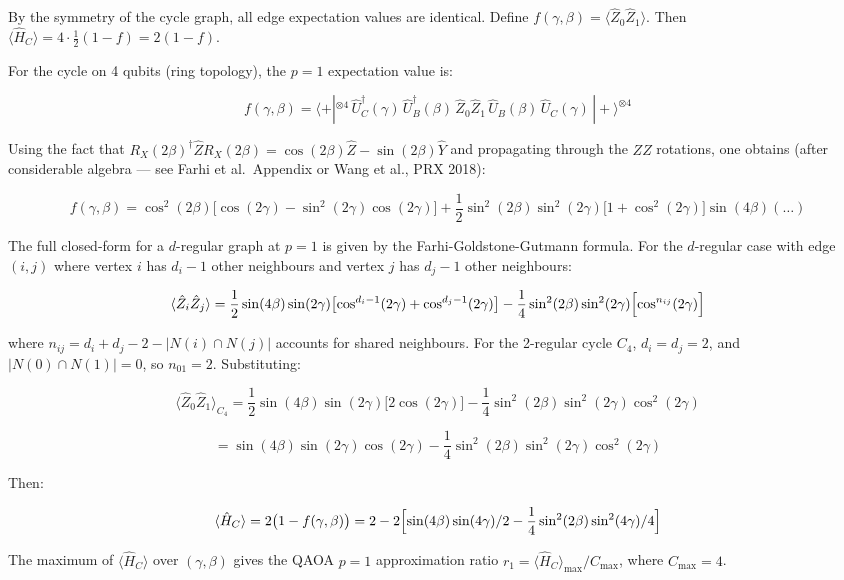 \documentclass[
  11pt,
]{report}
\begin{document}
By the symmetry of the cycle graph, all edge expectation values are
identical. Define
\(f(\gamma, \beta) = \langle \hat{Z}_0 \hat{Z}_1 \rangle\). Then
\(\langle \hat{H}_C \rangle = 4 \cdot \frac{1}{2}(1 - f) = 2(1 - f)\).

For the cycle on 4 qubits (ring topology), the \(p=1\) expectation value
is:

\[f(\gamma, \beta) = \langle +|^{\otimes 4}\, \hat{U}_C^\dagger(\gamma)\, \hat{U}_B^\dagger(\beta)\, \hat{Z}_0 \hat{Z}_1\, \hat{U}_B(\beta)\, \hat{U}_C(\gamma)\, |+\rangle^{\otimes 4}\]

Using the fact that
\(R_X(2\beta)^\dagger \hat{Z} R_X(2\beta) = \cos(2\beta)\hat{Z} - \sin(2\beta)\hat{Y}\)
and propagating through the \(ZZ\) rotations, one obtains (after
considerable algebra --- see Farhi et al.~Appendix or Wang et al., PRX
2018):

\[f(\gamma,\beta) = \cos^2(2\beta)\bigl[\cos(2\gamma) - \sin^2(2\gamma)\cos(2\gamma)\bigr] + \frac{1}{2}\sin^2(2\beta)\sin^2(2\gamma)\bigl[1 + \cos^2(2\gamma)\bigr]\sin(4\beta)(\ldots)\]

The full closed-form for a \(d\)-regular graph at \(p=1\) is given by
the Farhi-Goldstone-Gutmann formula. For the \(d\)-regular case with
edge \((i,j)\) where vertex \(i\) has \(d_i - 1\) other neighbours and
vertex \(j\) has \(d_j - 1\) other neighbours:

\[\langle \hat{Z}_i \hat{Z}_j \rangle = \frac{1}{2}\sin(4\beta)\sin(2\gamma)\bigl[\cos^{d_i-1}(2\gamma) + \cos^{d_j-1}(2\gamma)\bigr] - \frac{1}{4}\sin^2(2\beta)\sin^2(2\gamma)\Bigl[\cos^{n_{ij}}(2\gamma)\Bigr]\]

where \(n_{ij} = d_i + d_j - 2 - |N(i) \cap N(j)|\) accounts for shared
neighbours. For the 2-regular cycle \(C_4\), \(d_i = d_j = 2\), and
\(|N(0) \cap N(1)| = 0\), so \(n_{01} = 2\). Substituting:

\[\langle \hat{Z}_0\hat{Z}_1\rangle_{C_4} = \frac{1}{2}\sin(4\beta)\sin(2\gamma)\bigl[2\cos(2\gamma)\bigr] - \frac{1}{4}\sin^2(2\beta)\sin^2(2\gamma)\cos^2(2\gamma)\]

\[= \sin(4\beta)\sin(2\gamma)\cos(2\gamma) - \frac{1}{4}\sin^2(2\beta)\sin^2(2\gamma)\cos^2(2\gamma)\]

Then:

\[\langle \hat{H}_C \rangle = 2\bigl(1 - f(\gamma,\beta)\bigr) = 2 - 2\Bigl[\sin(4\beta)\sin(4\gamma)/2 - \frac{1}{4}\sin^2(2\beta)\sin^2(4\gamma)/4\Bigr]\]

The maximum of \(\langle \hat{H}_C \rangle\) over \((\gamma, \beta)\)
gives the QAOA \(p=1\) approximation ratio
\(r_1 = \langle \hat{H}_C \rangle_{\max} / C_{\max}\), where
\(C_{\max} = 4\).
\end{document}
